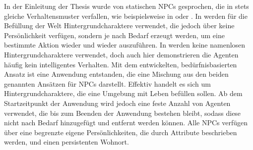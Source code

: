 In der Einleitung der Thesis wurde von statischen NPCs gesprochen, die in stets gleiche Verhaltensmuster verfallen, wie beispielsweise in  oder . In  werden für die Befüllung der Welt Hintergrundcharaktere verwendet, die jedoch über keine Persönlichkeit verfügen, sondern je nach Bedarf erzeugt werden, um eine bestimmte Aktion wieder und wieder auszuführen. In  werden keine namenlosen Hintergrundcharaktere verwendet, doch auch hier demonstrieren die Agenten häufig kein intelligentes Verhalten.
Mit dem entwickelten, bedürfnisbasierten Ansatz ist eine Anwendung entstanden, die eine Mischung aus den beiden genannten Ansätzen für NPCs darstellt. Effektiv handelt es sich um Hintergrundcharaktere, die eine Umgebung mit Leben befüllen sollen. Ab dem Startzeitpunkt der Anwendung wird jedoch eine feste Anzahl von Agenten verwendet, die bis zum Beenden der Anwendung bestehen bleibt, sodass diese nicht nach Bedarf hinzugefügt und entfernt werden können. Alle NPCs verfügen über eine begrenzte eigene Persönlichkeiten, die durch Attribute beschrieben werden, und einen persistenten Wohnort.

